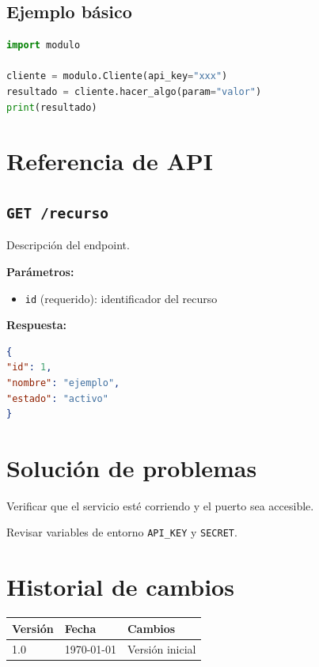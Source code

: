 \documentclass[12pt, letterpaper]{article}
\begin{document}
\subsection{Ejemplo básico}

\begin{lstlisting}[language=Python]
import modulo

cliente = modulo.Cliente(api_key="xxx")
resultado = cliente.hacer_algo(param="valor")
print(resultado)
\end{lstlisting}

\section{Referencia de API}

\subsection{\texttt{GET /recurso}}

Descripción del endpoint.

\textbf{Parámetros:}
\begin{itemize}
    \item \texttt{id} (requerido): identificador del recurso
\end{itemize}

\textbf{Respuesta:}
\begin{lstlisting}[language=json]
{
"id": 1,
"nombre": "ejemplo",
"estado": "activo"
}
\end{lstlisting}

\section{Solución de problemas}

\begin{description}[style=nextline]
    \item[\texttt{Error: conexión rechazada}]
        Verificar que el servicio esté corriendo y el puerto sea
accesible.
    \item[\texttt{Error: credenciales inválidas}]
        Revisar variables de entorno \texttt{API\_KEY} y
\texttt{SECRET}.
\end{description}

\section{Historial de cambios}

\begin{center}
\begin{tabular}{lll}
    \toprule
    \textbf{Versión} & \textbf{Fecha} & \textbf{Cambios} \\
    \midrule
    1.0 & \today & Versión inicial \\
    \bottomrule
\end{tabular}
\end{center}
\end{document}
